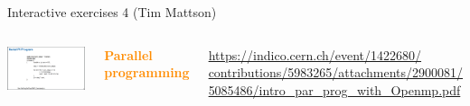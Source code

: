 \documentclass[aspectratio=169]{beamer}
\begin{document}
\begin{frame}{Interactive exercises 4 (Tim Mattson)}
\vspace{0.25 cm}
\large
\begin{columns}
\includegraphics[width=\linewidth]{PLOTS/parallel-processing.png}

\textcolor{darkorange}{\bf Parallel programming}

\tiny
\vspace{0.2 cm}
\textcolor{blue}{\href{https://indico.cern.ch/event/1422680/contributions/5983265/attachments/2900081/5085486/intro_par_prog_with_Openmp.pdf}{https://indico.cern.ch/event/1422680/ \\
%
contributions/5983265/attachments/2900081/
%
5085486/intro\_par\_prog\_with\_Openmp.pdf}}

\small
\vspace{0.25 cm}

\vspace{0.25 cm}

\vspace{0.25 cm}

\end{columns}
\end{frame}
\end{document}

